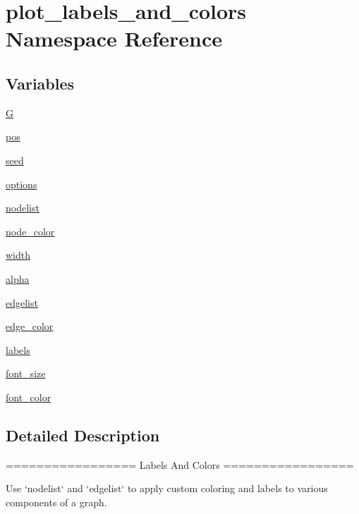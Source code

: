 \hypertarget{namespaceplot__labels__and__colors}{}\section{plot\+\_\+labels\+\_\+and\+\_\+colors Namespace Reference}
\label{namespaceplot__labels__and__colors}
\subsection*{Variables}
\begin{DoxyCompactItemize}
\item 
\hyperlink{namespaceplot__labels__and__colors_a878c81edeeddb6748ce7d8a26c21dd1e}{G}
\item 
\hyperlink{namespaceplot__labels__and__colors_af96b4076fa198532fc5223061b178fb5}{pos}
\item 
\hyperlink{namespaceplot__labels__and__colors_a0b7c18b52149c40665e8ffdbebaf4623}{seed}
\item 
\hyperlink{namespaceplot__labels__and__colors_a6fbddacd1f1ecfb14f7442f5c57ef42a}{options}
\item 
\hyperlink{namespaceplot__labels__and__colors_aad20bffa28b5611ce9dc69d38108c077}{nodelist}
\item 
\hyperlink{namespaceplot__labels__and__colors_a5edbf12090156978c2d7e3c530d25be9}{node\+\_\+color}
\item 
\hyperlink{namespaceplot__labels__and__colors_aaa11b38b3cdd2be71338071cd9ace6f0}{width}
\item 
\hyperlink{namespaceplot__labels__and__colors_a7c91dd087af5805e3ac446ef53ce2822}{alpha}
\item 
\hyperlink{namespaceplot__labels__and__colors_a52e5c189a513792fd8a0e320caee0234}{edgelist}
\item 
\hyperlink{namespaceplot__labels__and__colors_afd77b9d219c01731cbb5842d133f4898}{edge\+\_\+color}
\item 
\hyperlink{namespaceplot__labels__and__colors_ac74c43e2d343604ba68d14b918696013}{labels}
\item 
\hyperlink{namespaceplot__labels__and__colors_a97b59f94b65872f7f361d7070a2860d1}{font\+\_\+size}
\item 
\hyperlink{namespaceplot__labels__and__colors_a18593072329b9e8ce795d8cdb8454eeb}{font\+\_\+color}
\end{DoxyCompactItemize}


\subsection{Detailed Description}
\begin{DoxyVerb}=================
Labels And Colors
=================

Use `nodelist` and `edgelist` to apply custom coloring and labels to various
components of a graph.
\end{DoxyVerb}
 

